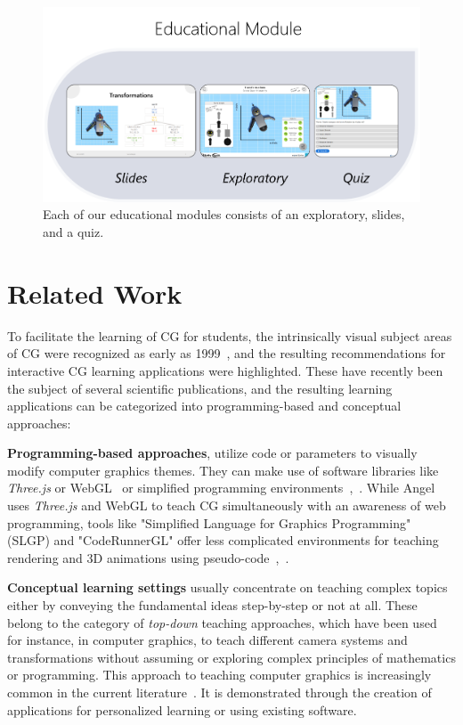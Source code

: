 \begin{figure}[b!th]
	\centering
	\includegraphics[width=\linewidth]{pictures/ExGoerContents.png}
	\captionsetup{labelfont=bf,textfont=it}
	\caption{Each of our educational modules consists of an exploratory, slides, and a quiz.\label{fig:contents}}
\end{figure}


\section{Related Work} %
To facilitate the learning of CG for students, the intrinsically visual subject areas of CG were recognized as early as 1999~\cite{Balreira:2017:topics-cg-teaching}, and the resulting recommendations for interactive CG learning applications were highlighted. These have recently been the subject of several scientific publications, and the resulting learning applications can be categorized into programming-based and conceptual approaches:

\textbf{Programming-based approaches}, utilize code or parameters to visually modify computer graphics themes. They can make use of software libraries like \emph{Three.js} or WebGL~\cite{angel:2017:interactive} or simplified programming environments~\cite{Sueyasu:2010:cg-tool},~\cite{Lobb:2016:cg-tool}. While Angel~\cite{angel:2017:interactive} uses \emph{Three.js} and WebGL to teach CG simultaneously with an awareness of web programming, tools like "Simplified Language for Graphics Programming" (SLGP) and "CodeRunnerGL" offer less complicated environments for teaching rendering and 3D animations using pseudo-code~\cite{Sueyasu:2010:cg-tool},~\cite{Lobb:2016:cg-tool}.

\textbf{Conceptual learning settings} usually concentrate on teaching complex topics either by conveying the fundamental ideas step-by-step or not at all. These belong to the category of \emph{top-down} teaching approaches, which have been used for instance, in computer graphics, to teach different camera systems and transformations without assuming or exploring complex principles of mathematics or programming. This approach to teaching computer graphics is increasingly common in the current literature~\cite{Suselo:2019:problems-cg-teaching}. It is demonstrated through the creation of applications for personalized learning or using existing software.

